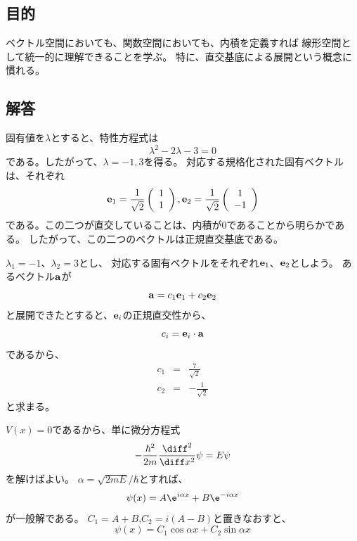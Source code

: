 \subsection{目的}
ベクトル空間においても、関数空間においても、内積を定義すれば
線形空間として統一的に理解できることを学ぶ。
特に、直交基底による展開という概念に慣れる。

\subsection{解答}

固有値を$\lambda$とすると、特性方程式は
\begin{equation}
  \lambda^2 - 2 \lambda -3 = 0
\end{equation}
である。したがって、$\lambda = -1,3$を得る。
対応する規格化された固有ベクトルは、それぞれ
\begin{equation}
  {\bf e}_1 =
  \frac{1}{\sqrt{2}}
  \left(
  \begin{array}{c}
      1 \\ 1
    \end{array}
  \right)
  ,
  {\bf e}_2 =
  \frac{1}{\sqrt{2}}
  \left(
  \begin{array}{c}
      1 \\ -1
    \end{array}
  \right)
\end{equation}
である。この二つが直交していることは、内積が$0$であることから明らかである。
したがって、この二つのベクトルは正規直交基底である。

$\lambda_1 = -1$、$\lambda_2 = 3$とし、
対応する固有ベクトルをそれぞれ${\bf e}_1$、${\bf e}_2$としよう。
あるベクトル${\bf a}$が
$$
  {\bf a} = c_1 {\bf e}_1 +c_2 {\bf e}_2
$$
と展開できたとすると、${\bf e}_i$の正規直交性から、
$$
  c_i = {\bf e}_i \cdot {\bf a}
$$
であるから、
\begin{eqnarray}
  c_1 &=& \frac{7}{\sqrt{2}}\\
  c_2 &=& -\frac{1}{\sqrt{2}}
\end{eqnarray}
と求まる。

$V(x)=0$であるから、単に微分方程式
\begin{equation}
  -\frac{\hbar^2}{2m} \frac{\diff^2}{\diff x^2} \psi = E \psi
\end{equation}
を解けばよい。
$\alpha = \sqrt{2mE}/\hbar$とすれば、
\begin{equation}
  \psi(x) = A \e^{i \alpha x} + B \e^{- i \alpha x}
\end{equation}
が一般解である。
$C_1 = A+B$,$C_2 = i(A-B)$と置きなおすと、
\begin{equation}
  \psi(x) = C_1 \cos{\alpha x} + C_2 \sin{\alpha x}
\end{equation}



